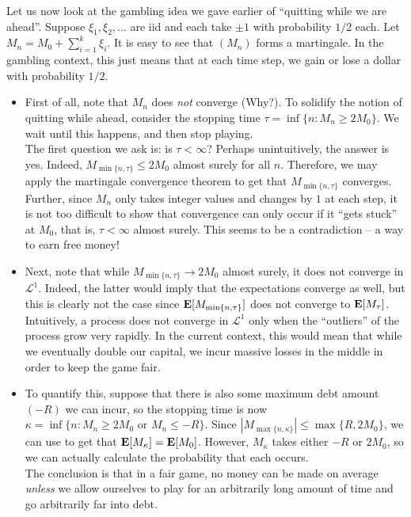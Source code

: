		Let us now look at the gambling idea we gave earlier of ``quitting while we are ahead''. Suppose $\xi_1,\xi_2,\ldots$ are iid and each take $\pm 1$ with probability $1/2$ each. Let $M_n = M_0 + \sum_{i=1}^k \xi_i$. It is easy to see that $(M_n)$ forms a martingale. In the gambling context, this just means that at each time step, we gain or lose a dollar with probability $1/2$.
		\begin{itemize}
			\item First of all, note that $M_n$ does \textit{not} converge (Why?). To solidify the notion of quitting while ahead, consider the stopping time $\tau = \inf\{n : M_n\geq 2M_0\}$. We wait until this happens, and then stop playing.\\
			The first question we ask is: is $\tau<\infty$? Perhaps unintuitively, the answer is yes. Indeed, $M_{\min\{n,\tau\}} \leq 2M_0$ almost surely for all $n$. Therefore, we may apply the martingale convergence theorem to get that $M_{\min\{n,\tau\}}$ converges. Further, since $M_n$ only takes integer values and changes by $1$ at each step, it is not too difficult to show that convergence can only occur if it ``gets stuck'' at $M_0$, that is, $\tau<\infty$ almost surely. This seems to be a contradiction --  a way to earn free money!

			\item Next, note that while $M_{\min\{n,\tau\}}\to 2M_0$ almost surely, it does not converge in $\mathcal{L}^1$. Indeed, the latter would imply that the expectations converge as well, but this is clearly not the case since $\textbf{E}[M_{\min\{n,\tau\}}]$ does not converge to $\textbf{E}[M_\tau]$. Intuitively, a process does not converge in $\mathcal{L}^1$ only when the ``outliers'' of the process grow very rapidly. In the current context, this would mean that while we eventually double our capital, we incur massive losses in the middle in order to keep the game fair.

			\item To quantify this, suppose that there is also some maximum debt amount $(-R)$ we can incur, so the stopping time is now $\kappa = \inf\{n : M_n\geq 2M_0 \text{ or }M_n\leq -R\}$. Since $|M_{\max\{n,\kappa\}}| \leq \max\{R,2M_0\}$, we can use  to get that $\textbf{E}[M_\kappa] = \textbf{E}[M_0]$. However, $M_\kappa$ takes either $-R$ or $2M_0$, so we can actually calculate the probability that each occurs.\\
			The conclusion is that in a fair game, no money can be made on average \textit{unless} we allow ourselves to play for an arbitrarily long amount of time and go arbitrarily far into debt.
		\end{itemize}

